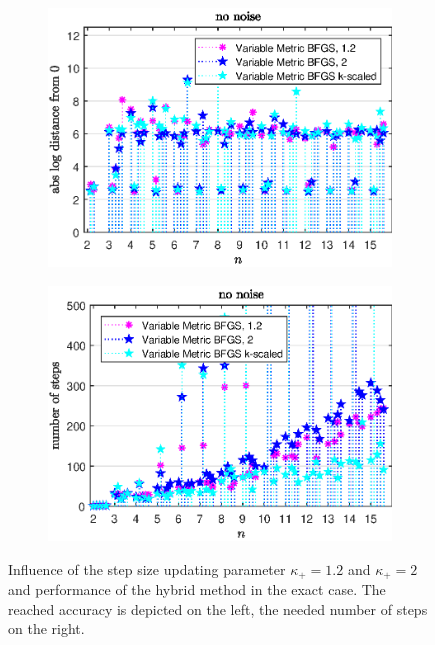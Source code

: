 \begin{figure}[H]%
	\begin{subfigure}{0.49\textwidth}
		\includegraphics[width=\textwidth]{Pictures/Plots/no_noise_comp.eps}%
	\end{subfigure}%
	\hfill
	\begin{subfigure}{0.49\textwidth}
		\includegraphics[width=\textwidth]{Pictures/Plots/steps_no_noise_comp.eps}%
	\end{subfigure}
	\caption[Influence of the step size updating parameter and hybrid method: no noise]{Influence of the step size updating parameter \(\kappa_+ = 1.2\) and \(\kappa_+ =2 \) and performance of the hybrid method in the exact case. The reached accuracy is depicted on the left, the needed number of steps on the right.}
	\label{fig_no_noise_comp}
\end{figure}

